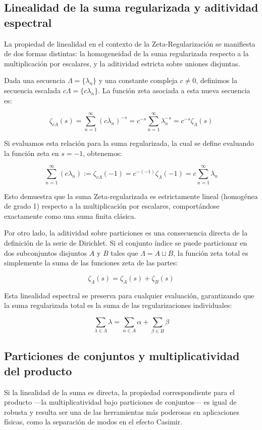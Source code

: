 \subsection{Linealidad de la suma regularizada y aditividad espectral}

La propiedad de linealidad en el contexto de la Zeta-Regularización se manifiesta de dos formas distintas: la homogeneidad de la suma regularizada respecto a la multiplicación por escalares, y la aditividad estricta sobre uniones disjuntas.

Dada una secuencia $\Lambda = \{\lambda_n\}$ y una constante compleja $c \neq 0$, definimos la secuencia escalada $c\Lambda = \{c\lambda_n\}$. La función zeta asociada a esta nueva secuencia es:

$$ \zeta_{c\Lambda}(s) = \sum_{n=1}^{\infty} (c\lambda_n)^{-s} = c^{-s} \sum_{n=1}^{\infty} \lambda_n^{-s} = c^{-s} \zeta_\Lambda(s) $$

Si evaluamos esta relación para la suma regularizada, la cual se define evaluando la función zeta en $s = -1$, obtenemos:

$$ \sum_{n=1}^{\infty} (c\lambda_n) := \zeta_{c\Lambda}(-1) = c^{-(-1)} \zeta_\Lambda(-1) = c \sum_{n=1}^{\infty} \lambda_n $$

Esto demuestra que la suma Zeta-regularizada es estrictamente lineal (homogénea de grado 1) respecto a la multiplicación por escalares, comportándose exactamente como una suma finita clásica.

Por otro lado, la aditividad sobre particiones es una consecuencia directa de la definición de la serie de Dirichlet. Si el conjunto índice se puede particionar en dos subconjuntos disjuntos $A$ y $B$ tales que $\Lambda = A \sqcup B$, la función zeta total es simplemente la suma de las funciones zeta de las partes:

$$ \zeta_\Lambda(s) = \zeta_A(s) + \zeta_B(s) $$

Esta linealidad espectral se preserva para cualquier evaluación, garantizando que la suma regularizada total es la suma de las regularizaciones individuales:

$$ \sum_{\lambda \in \Lambda} \lambda = \sum_{\alpha \in A} \alpha + \sum_{\beta \in B} \beta $$

\subsection{Particiones de conjuntos y multiplicatividad del producto}

Si la linealidad de la suma es directa, la propiedad correspondiente para el producto —la multiplicatividad bajo particiones de conjuntos— es igual de robusta y resulta ser una de las herramientas más poderosas en aplicaciones físicas, como la separación de modos en el efecto Casimir.

